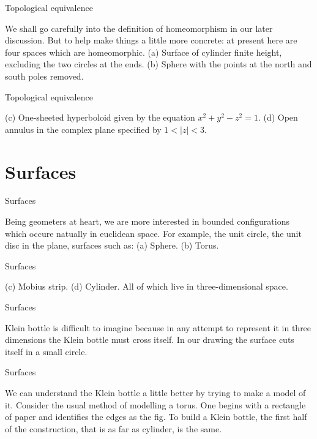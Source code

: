 \documentclass{beamer}
\begin{document}
\begin{frame}{Topological equivalence}
  \begin{block}{}
    We shall go carefully into the definition of homeomorphism in our later discussion. But to help make things a little more concrete: at present here are four spaces which are homeomorphic. (a) Surface of cylinder finite height, excluding the two circles at the ends. (b) Sphere with the points at the north and south poles removed.
  \end{block}
\end{frame}

\begin{frame}{Topological equivalence}
  \begin{block}{}
    (c) One-sheeted hyperboloid given by the equation $x^2 + y^2 - z^2 = 1$. (d) Open annulus in the complex plane specified by $1 < |z| < 3$.
  \end{block}
\end{frame}

\section{Surfaces}

\begin{frame}{Surfaces}
  \begin{block}{}
    Being geometers at heart, we are more interested in bounded configurations which occure natually in euclidean space. For example, the unit circle, the unit disc in the plane, surfaces such as: (a) Sphere. (b) Torus.
  \end{block}
\end{frame}

\begin{frame}{Surfaces}
  \begin{block}{}
    (c) Mobius strip. (d) Cylinder. All of which live in three-dimensional space.
  \end{block}
\end{frame}

\begin{frame}{Surfaces}
  \begin{block}{}
    Klein bottle is difficult to imagine because in any attempt to represent it in three dimensions the Klein bottle must cross itself. In our drawing the surface cuts itself in a small circle.
  \end{block}
\end{frame}

\begin{frame}{Surfaces}
  \begin{block}{}
    We can understand the Klein bottle a little better by trying to make a model of it. Consider the usual method of modelling a torus. One begins with a rectangle of paper and identifies the edges as the fig. To build a Klein bottle, the first half of the construction, that is as far as cylinder, is the same.
  \end{block}
\end{frame}
\end{document}
